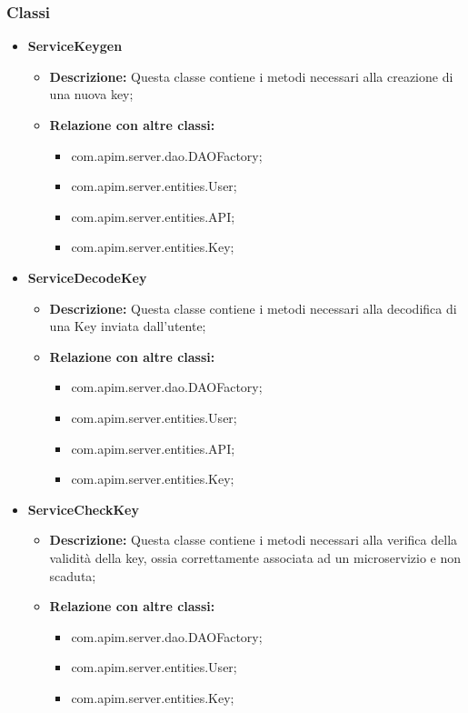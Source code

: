 {{{        \subsubsection{Classi}
        \begin{itemize} \itemsep1pt
          \item \textbf{ServiceKeygen}
          \begin{itemize}
            \item \textbf{Descrizione:} Questa classe contiene i metodi necessari alla creazione di una nuova key;
            \item \textbf{Relazione con altre classi:}
            \begin{itemize}
            \item com.apim.server.dao.DAOFactory;
            \item com.apim.server.entities.User;
            \item com.apim.server.entities.API;
            \item com.apim.server.entities.Key;
            \end{itemize}
          \end{itemize}
          \item \textbf{ServiceDecodeKey}
          \begin{itemize}
            \item \textbf{Descrizione:} Questa classe contiene i metodi necessari alla decodifica di una Key inviata dall'utente;
            \item \textbf{Relazione con altre classi:}
            \begin{itemize}
            \item com.apim.server.dao.DAOFactory;
            \item com.apim.server.entities.User;
            \item com.apim.server.entities.API;
            \item com.apim.server.entities.Key;
            \end{itemize}
          \end{itemize}
          \item \textbf{ServiceCheckKey}
            \begin{itemize}
              \item \textbf{Descrizione:} Questa classe contiene i metodi necessari alla verifica della validità della key, ossia correttamente associata ad un microservizio e non scaduta;
              \item \textbf{Relazione con altre classi:}
              \begin{itemize}
              \item com.apim.server.dao.DAOFactory;
              \item com.apim.server.entities.User;
              \item com.apim.server.entities.Key;
              \end{itemize}
            \end{itemize}
          \end{itemize}
}}}
